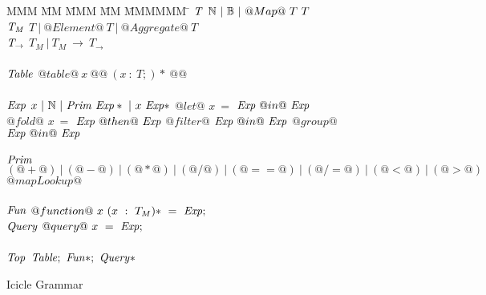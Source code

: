 
\begin{figure}

\begin{tabbing}
MMM \= MM \= MMM \= MM \= MMMMMM \= \kill
$\mathit{T}$
\GrammarDef
  $\mathbb{N}~|~\mathbb{B}~|~@Map@~T~T$
\\
$\mathit{T_M}$
\GrammarDef
  $T~|~@Element@~T~|~@Aggregate@~T$
\\
$\mathit{T_\to}$
\GrammarDef
  $T_M ~|~ T_M~\to~T_\to$
\\
\\

$\mathit{Table}$
\GrammarDef
  $@table@~x~@{@~(x~:~T;)*~@}@$
\\
\\

$\mathit{Exp}$
\GrammarDef
  $x~|~\mathbb{N}~|~\mathit{Prim}~\mathit{Exp}*~|~x~\mathit{Exp}*$
\GrammarAlt
  $@let@$   \> $x~=$ \> $\mathit{Exp}~@  in@~\mathit{Exp}$
\GrammarAlt
  $@fold@$  \> $x~=$ \> $\mathit{Exp}~@then@~\mathit{Exp}$
\GrammarAlt
  $@filter@$\> \> $\mathit{Exp}~@  in@~\mathit{Exp}$
\GrammarAlt
  $@group@$ \> \> $\mathit{Exp}~@  in@~\mathit{Exp}$
\\
\\

$\mathit{Prim}$
\GrammarDef
  $(@+@)~|~(@-@)~|~(@*@)~|~(@/@)~|~(@==@)~|~(@/=@)~|~(@<@)~|~(@>@)$
\GrammarAlt
  $@mapLookup@$
\\
\\


$\mathit{Fun}$
\GrammarDef
  $@function@~x~(x~:~T_M)*~=~\mathit{Exp};$
\\

$\mathit{Query}$
\GrammarDef
  $@query@~x~=~\mathit{Exp};$
\\
\\
$\mathit{Top}$
\GrammarDef
  $\mathit{Table};~\mathit{Fun}*;~\mathit{Query}*$
\end{tabbing}

\caption{Icicle Grammar}
\label{fig:source:grammar}
\end{figure}

